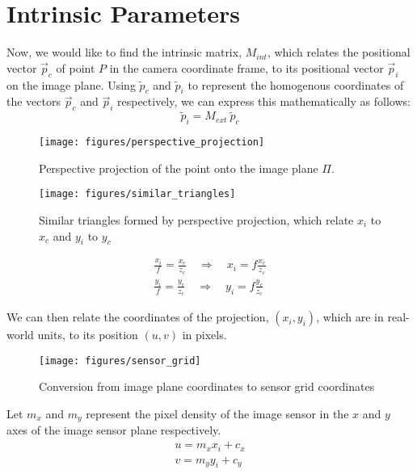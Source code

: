 \section{Intrinsic Parameters} \label{sec:intrinsics}
Now, we would like to find the intrinsic matrix, $M_{int}$, which relates the positional vector $\vec{p}_c$ of point $P$ in the camera coordinate frame, to its positional vector $\vec{p}_i$ on the image plane. Using $\widetilde{p}_c$ and $\widetilde{p}_i$ to represent the homogenous coordinates of the vectors $\vec{p}_c$ and $\vec{p}_i$ respectively, we can express this mathematically as follows:
\begin{equation}
    \widetilde{p}_i =  M_{ext}\:\widetilde{p}_c
\end{equation}


\begin{figure}[H]
    \centering
    \texttt{[image: figures/perspective\_projection]}
    \caption{Perspective projection of the point onto the image plane $\Pi$.}
\end{figure}

\begin{figure}[H]
    \centering
    \texttt{[image: figures/similar\_triangles]}
    \caption{Similar triangles formed by perspective projection, which relate $x_i$ to $x_c$ and $y_i$ to $y_c$}
\end{figure}

\begin{subequations}
    \begin{gather}
        \frac{x_i}{f} = \frac{x_c}{z_c} \quad \Longrightarrow \quad x_i = f \frac{x_c}{z_c} \label{subeq:xi_result}\\
        \frac{y_i}{f} = \frac{y_c}{z_c} \quad \Longrightarrow \quad y_i = f \frac{y_c}{z_c} \label{subeq:yi_result}
    \end{gather}
\end{subequations}

We can then relate the coordinates of the projection, $(x_i, y_i)$, which are in real-world units, to its position $(u, v)$ in pixels. 
\begin{figure}[H]
    \centering
    \texttt{[image: figures/sensor\_grid]}
    \caption{Conversion from image plane coordinates to sensor grid coordinates}
\end{figure}
Let $m_x$ and $m_y$ represent the pixel density of the image sensor in the $x$ and $y$ axes of the image sensor plane respectively.
\begin{subequations}
    \begin{align}
        u = m_x x_i + c_x \\
        v = m_y y_i + c_y 
    \end{align}
\end{subequations}

